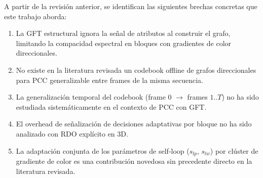     A partir de la revisión anterior, se identifican las siguientes brechas concretas que
    este trabajo aborda:
    \begin{enumerate}
        \item La GFT estructural ignora la señal de atributos al construir el grafo,
              limitando la compacidad espectral en bloques con gradientes de color
              direccionales.
        \item No existe en la literatura revisada un codebook offline de grafos
              direccionales para PCC generalizable entre frames de la misma secuencia.
        \item La generalización temporal del codebook (frame 0 $\to$ frames $1..T$) no ha
              sido estudiada sistemáticamente en el contexto de PCC con GFT.
        \item El overhead de señalización de decisiones adaptativas por bloque no ha sido
              analizado con RDO explícito en 3D.
        \item La adaptación conjunta de los parámetros de self-loop ($s_{lp}$, $s_{lw}$)
              por clúster de gradiente de color es una contribución novedosa sin
              precedente directo en la literatura revisada.
    \end{enumerate}
